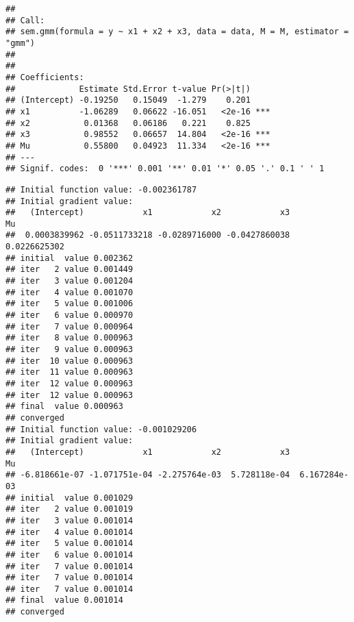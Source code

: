 \begin{knitrout}
\begin{kframe}
\begin{alltt}
  \hlstd{=} \hlstd{)}
\end{alltt}
\begin{verbatim}
## 
## Call:
## sem.gmm(formula = y ~ x1 + x2 + x3, data = data, M = M, estimator = "gmm")
## 
## 
## Coefficients:
##             Estimate Std.Error t-value Pr(>|t|)    
## (Intercept) -0.19250   0.15049  -1.279    0.201    
## x1          -1.06289   0.06622 -16.051   <2e-16 ***
## x2           0.01368   0.06186   0.221    0.825    
## x3           0.98552   0.06657  14.804   <2e-16 ***
## Mu           0.55800   0.04923  11.334   <2e-16 ***
## ---
## Signif. codes:  0 '***' 0.001 '**' 0.01 '*' 0.05 '.' 0.1 ' ' 1
\end{verbatim}
\begin{alltt}
 \hlkwb{<-}  \hlopt{~}  \hlopt{+}  \hlopt{+}   
                     \hlstd{=} \hlstd{)}
\end{alltt}
\begin{verbatim}
## Initial function value: -0.002361787 
## Initial gradient value:
##   (Intercept)            x1            x2            x3            Mu 
##  0.0003839962 -0.0511733218 -0.0289716000 -0.0427860038  0.0226625302 
## initial  value 0.002362 
## iter   2 value 0.001449
## iter   3 value 0.001204
## iter   4 value 0.001070
## iter   5 value 0.001006
## iter   6 value 0.000970
## iter   7 value 0.000964
## iter   8 value 0.000963
## iter   9 value 0.000963
## iter  10 value 0.000963
## iter  11 value 0.000963
## iter  12 value 0.000963
## iter  12 value 0.000963
## final  value 0.000963 
## converged
## Initial function value: -0.001029206 
## Initial gradient value:
##   (Intercept)            x1            x2            x3            Mu 
## -6.818661e-07 -1.071751e-04 -2.275764e-03  5.728118e-04  6.167284e-03 
## initial  value 0.001029 
## iter   2 value 0.001019
## iter   3 value 0.001014
## iter   4 value 0.001014
## iter   5 value 0.001014
## iter   6 value 0.001014
## iter   7 value 0.001014
## iter   7 value 0.001014
## iter   7 value 0.001014
## final  value 0.001014 
## converged
\end{verbatim}
\begin{alltt}
  \hlstd{=} \hlstd{)}
\end{alltt}
\begin{verbatim}

\end{verbatim}
\end{kframe}
\end{knitrout}
